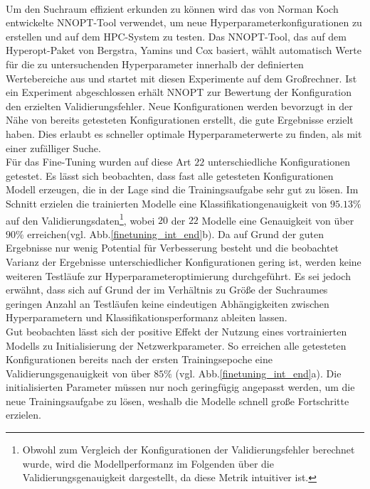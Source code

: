 \\
Um den Suchraum effizient erkunden zu können wird das von Norman Koch entwickelte NNOPT-Tool verwendet, um neue Hyperparameterkonfigurationen zu erstellen und auf dem HPC-System zu testen. Das NNOPT-Tool, das auf dem Hyperopt-Paket \cite{hyperopt} von Bergstra, Yamins und Cox basiert, wählt automatisch Werte für die zu untersuchenden Hyperparameter innerhalb der definierten Wertebereiche aus und startet mit diesen Experimente auf dem Großrechner. Ist ein Experiment abgeschlossen erhält NNOPT zur Bewertung der Konfiguration den erzielten Validierungsfehler. Neue Konfigurationen werden bevorzugt in der Nähe von bereits getesteten Konfigurationen erstellt, die gute Ergebnisse erzielt haben. Dies erlaubt es schneller optimale Hyperparameterwerte zu finden, als mit einer zufälliger Suche.
\\
Für das Fine-Tuning wurden auf diese Art $22$ unterschiedliche Konfigurationen getestet. Es lässt sich beobachten, dass fast alle getesteten Konfigurationen Modell erzeugen, die in der Lage sind die Trainingsaufgabe sehr gut zu lösen. Im Schnitt erzielen die trainierten Modelle eine Klassifikationgenauigkeit von $95.13\%$ auf den Validierungsdaten\footnote{Obwohl zum Vergleich der Konfigurationen der Validierungsfehler berechnet wurde, wird die Modellperformanz im Folgenden über die Validierungsgenauigkeit dargestellt, da diese Metrik intuitiver ist.}, wobei $20$ der $22$ Modelle eine Genauigkeit von über $90\%$ erreichen(vgl. Abb.\ref{finetuning_int_end}b). Da auf Grund der guten Ergebnisse nur wenig Potential für Verbesserung besteht und die beobachtet Varianz der Ergebnisse unterschiedlicher Konfigurationen gering ist, werden keine weiteren Testläufe zur Hyperparameteroptimierung durchgeführt. Es sei jedoch erwähnt, dass sich auf Grund der im Verhältnis zu Größe der Suchraumes geringen Anzahl an Testläufen keine eindeutigen Abhängigkeiten zwischen Hyperparametern und Klassifikationsperformanz ableiten lassen.
\\
Gut beobachten lässt sich der positive Effekt der Nutzung eines vortrainierten Modells zu Initialisierung der Netzwerkparameter. So erreichen alle getesteten Konfigurationen bereits nach der ersten Trainingsepoche eine Validierungsgenauigkeit von über $85\%$ (vgl. Abb.\ref{finetuning_int_end}a). Die initialisierten Parameter müssen nur noch geringfügig angepasst werden, um die neue Trainingsaufgabe zu lösen, weshalb die Modelle schnell große Fortschritte erzielen. 
\\
